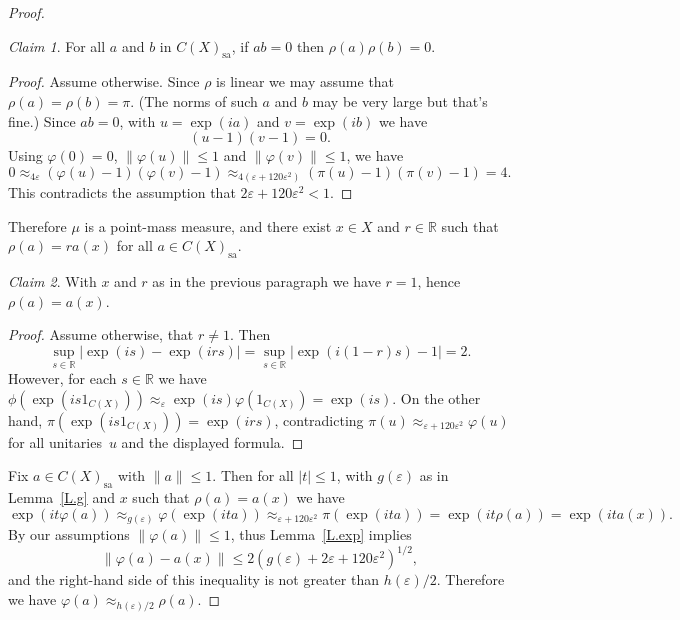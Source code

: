 \documentclass[11pt]{amsproc}
\newcommand{\bbR}{\mathbb R}
\DeclareMathOperator{\sgn}{sgn}
\theoremstyle{definition}
\theoremstyle{plain}
\theoremstyle{remark}
\newtheorem{claim}{Claim}
\begin{document}
\begin{proof}
	\begin{claim}
		For all $a$ and $b$ in $C(X)_{\textrm{sa}}$, if $ab=0$ then $\rho(a)\rho(b)=0$. 
	\end{claim}
	
	\begin{proof}
		Assume otherwise. Since $\rho$ is linear we may assume that $\rho(a)=\rho(b)=\pi$. (The norms of such $a$ and $b$ may be very large but that's fine.)
		Since $ab=0$, with $u=\exp(ia)$ and $v=\exp(ib)$ we have 
		\[
		(u-1)(v-1)=0. 
		\]
		Using $\varphi(0)=0$, $\|\varphi(u)\|\leq 1$ and $\|\varphi(v)\|\leq 1$, we have 
		\[
		0\approx_{4\varepsilon} (\varphi(u)-1)(\varphi(v)-1)\approx_{4 (\varepsilon+120\varepsilon^2)}
		(\pi(u)-1)(\pi(v)-1)=4.
		\]
		This contradicts the assumption that 
		$2 \varepsilon+120\varepsilon^2<1$. 
	\end{proof}
	
	Therefore $\mu$ is a point-mass measure, and there exist $x\in X$ and $r\in \bbR$ such that $\rho(a)=ra(x)$ for all $a\in C(X)_{\textrm{sa}}$. 
	
	\begin{claim}
		With $x$ and $r$ as in the previous paragraph we have $r=1$, hence $\rho(a)=a(x)$.  
	\end{claim}
	
	\begin{proof}
		Assume otherwise, that $r\neq 1$. Then 
		\[
		\sup_{s\in \bbR} |\exp(is)-\exp(irs)|=
		\sup_{s\in \bbR} |\exp(i(1-r)s)-1|=2. 
		\]
		However, for each $s\in \bbR$  we have  $\phi(\exp(is 1_{C(X)}))\approx_\varepsilon \exp(is)\varphi(1_{C(X)})=\exp(is)$. 
		On the other hand, $\pi(\exp(is 1_{C(X)}))=\exp(irs)$, contradicting $\pi(u)\approx_{\varepsilon+120\varepsilon^2}\varphi(u)$ for all unitaries~$u$ and the displayed formula. 
	\end{proof}
	
	
	Fix $a\in C(X)_{\textrm{sa}}$ with $\|a\|\leq 1$. Then for all $|t|\leq 1$, with $g(\varepsilon)$ as in Lemma~\ref{L.g}  and $x$ such that $\rho(a)=a(x)$ we have 
	\[
	\exp(it \varphi(a))\approx_{g(\varepsilon)} \varphi(\exp (ita))\approx_{\varepsilon+120\varepsilon^2} \pi(\exp(ita))=\exp(it\rho(a))=\exp(it  a(x)). 
	\]
	By our assumptions $\|\varphi(a)\|\leq 1$,  thus 
	Lemma~\ref{L.exp} implies 
	\[
	\|\varphi(a)-a(x)\|\leq 2(g(\varepsilon)+2\varepsilon+120\varepsilon^2)^{1/2}, 
	\] 
	and the right-hand side of this inequality is not greater than 
	$h(\varepsilon)/2$. Therefore we have   $\varphi(a)\approx_{h(\varepsilon)/2}\rho(a)$.
	

\end{proof}
\end{document}
